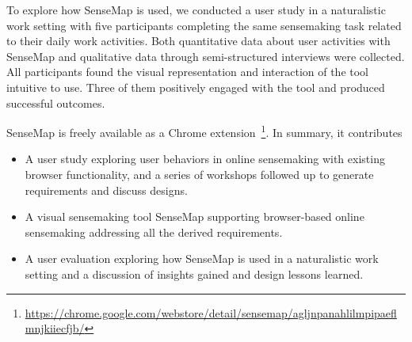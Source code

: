 To explore how SenseMap is used, we conducted a user study in a naturalistic work setting with five participants completing the same sensemaking task related to their daily work activities. Both quantitative data about user activities with SenseMap and qualitative data through semi-structured interviews were collected. All participants found the visual representation and interaction of the tool intuitive to use. Three of them positively engaged with the tool and produced successful outcomes.

SenseMap is freely available as a Chrome extension~\footnote{\url{https://chrome.google.com/webstore/detail/sensemap/agljnpanahlilmpipaeflmnjkiiecfjb/}}. In summary, it contributes
\begin{itemize}
\item A user study exploring user behaviors in online sensemaking with existing browser functionality, and a series of workshops followed up to generate requirements and discuss designs.
\item A visual sensemaking tool SenseMap supporting browser-based online sensemaking addressing all the derived requirements.
\item A user evaluation exploring how SenseMap is used in a naturalistic work setting and a discussion of insights gained and design lessons learned.
\end{itemize}